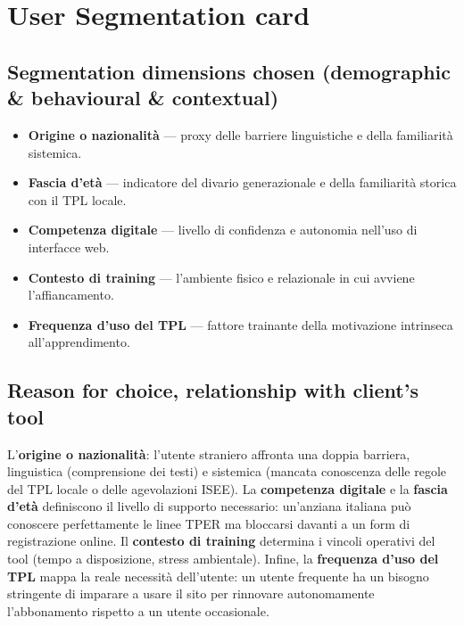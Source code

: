 \documentclass[11pt,a4paper]{article}
\begin{document}
\newpage
\section{User Segmentation card}

\subsection{Segmentation dimensions chosen (demographic \& behavioural \& contextual)}

\begin{tcolorbox}[colback=backgroundColor,colframe=borderColor,arc=2mm]
\begin{itemize}[leftmargin=*,itemsep=4pt]
    \item \textbf{Origine o nazionalità} --- proxy delle barriere linguistiche e della familiarità sistemica.
    \item \textbf{Fascia d'età} --- indicatore del divario generazionale e della familiarità storica con il TPL locale.
    \item \textbf{Competenza digitale} --- livello di confidenza e autonomia nell'uso di interfacce web.
    \item \textbf{Contesto di training} --- l'ambiente fisico e relazionale in cui avviene l'affiancamento.
    \item \textbf{Frequenza d'uso del TPL} --- fattore trainante della motivazione intrinseca all'apprendimento.
\end{itemize}
\end{tcolorbox}

\vspace{0.5cm}

\subsection{Reason for choice, relationship with client's tool}

L'\textbf{origine o nazionalità}: l'utente straniero affronta una doppia barriera, linguistica (comprensione dei testi) e sistemica (mancata conoscenza delle regole del TPL locale o delle agevolazioni ISEE). 
La \textbf{competenza digitale} e la \textbf{fascia d'età} definiscono il livello di supporto necessario: un'anziana italiana può conoscere perfettamente le linee TPER ma bloccarsi davanti a un form di registrazione online.
Il \textbf{contesto di training} determina i vincoli operativi del tool (tempo a disposizione, stress ambientale). Infine, la \textbf{frequenza d'uso del TPL} mappa la reale necessità dell'utente: un utente frequente ha un bisogno stringente di imparare a usare il sito per rinnovare autonomamente l'abbonamento rispetto a un utente occasionale.
\end{document}

